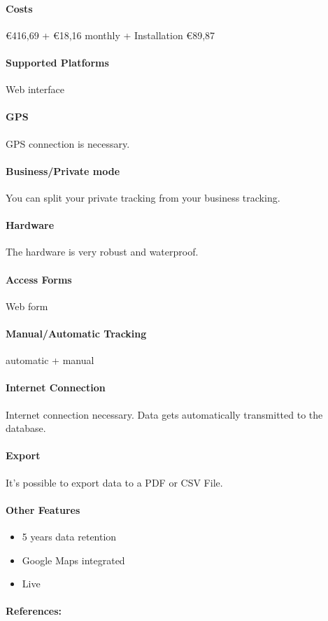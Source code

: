 \paragraph{Costs}\euro 416,69 + \euro 18,16 monthly + Installation \euro 89,87 
\paragraph{Supported Platforms} Web interface
\paragraph{GPS} GPS connection is necessary.
\paragraph{Business/Private mode}You can split your private tracking from your business tracking.
\paragraph{Hardware}The hardware is very robust and waterproof.
\paragraph{Access Forms}Web form
\paragraph{Manual/Automatic Tracking}automatic + manual
\paragraph{Internet Connection}Internet connection necessary.
Data gets automatically  transmitted to the database.
\paragraph{Export}It’s possible to export data to a PDF or CSV File.
\paragraph{Other Features}
\begin{itemize}
\item 5 years data retention  
\item Google Maps integrated
\item Live
\end{itemize}
\paragraph{References:} \cite{GPS_Log_Book_LIVE}
\newpage

